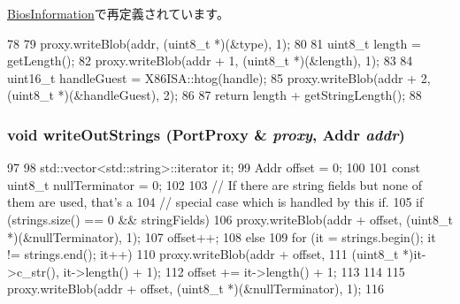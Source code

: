 \hyperlink{classX86ISA_1_1SMBios_1_1BiosInformation_a2dbf6f51e91cb24abfc247d73c0b857d}{BiosInformation}で再定義されています。


\begin{DoxyCode}
78 {
79     proxy.writeBlob(addr, (uint8_t *)(&type), 1);
80 
81     uint8_t length = getLength();
82     proxy.writeBlob(addr + 1, (uint8_t *)(&length), 1);
83 
84     uint16_t handleGuest = X86ISA::htog(handle);
85     proxy.writeBlob(addr + 2, (uint8_t *)(&handleGuest), 2);
86 
87     return length + getStringLength();
88 }
\end{DoxyCode}
\hypertarget{classX86ISA_1_1SMBios_1_1SMBiosStructure_ac064067fd8f527b9f81bbf3f851a173d}{
\subsubsection[{writeOutStrings}]{\setlength{\rightskip}{0pt plus 5cm}void writeOutStrings ({\bf PortProxy} \& {\em proxy}, \/  {\bf Addr} {\em addr})}}
\label{classX86ISA_1_1SMBios_1_1SMBiosStructure_ac064067fd8f527b9f81bbf3f851a173d}



\begin{DoxyCode}
97 {
98     std::vector<std::string>::iterator it;
99     Addr offset = 0;
100 
101     const uint8_t nullTerminator = 0;
102 
103     // If there are string fields but none of them are used, that's a
104     // special case which is handled by this if.
105     if (strings.size() == 0 && stringFields) {
106         proxy.writeBlob(addr + offset, (uint8_t *)(&nullTerminator), 1);
107         offset++;
108     } else {
109         for (it = strings.begin(); it != strings.end(); it++) {
110             proxy.writeBlob(addr + offset,
111                     (uint8_t *)it->c_str(), it->length() + 1);
112             offset += it->length() + 1;
113         }
114     }
115     proxy.writeBlob(addr + offset, (uint8_t *)(&nullTerminator), 1);
116 }
\end{DoxyCode}


